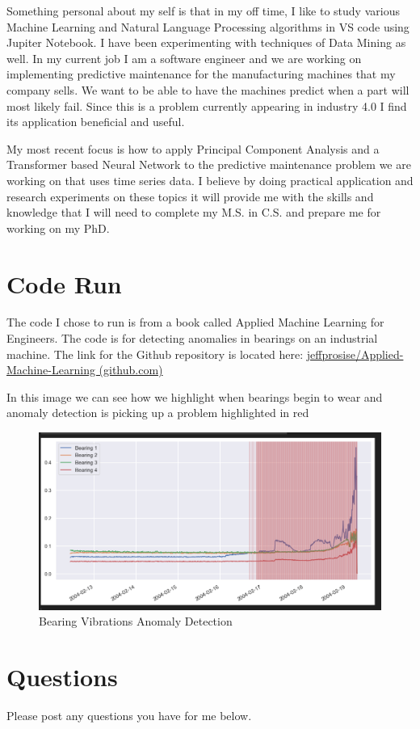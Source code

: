\documentclass{article}
\begin{document}
Something personal about my self is that in my off time, I like to study various Machine Learning and Natural Language Processing algorithms in VS code using Jupiter Notebook. I have been experimenting with techniques of Data Mining as well. In my current job I am a software engineer and we are working on implementing predictive maintenance for the manufacturing machines that my company sells. We want to be able to have the machines predict when a part will most likely fail. Since this is a problem currently appearing in industry 4.0 I find its application beneficial and useful.

My most recent focus is how to apply Principal Component Analysis and a Transformer based Neural Network to the predictive maintenance problem we are working on that uses time series data. I believe by doing practical application and research experiments on these topics it will provide me with the skills and knowledge that I will need to complete my M.S. in C.S. and prepare me for working on my PhD.

\section{Code Run}

The code I chose to run is from a book called Applied Machine Learning for Engineers. The code is for detecting anomalies in bearings on an industrial machine. The link for the Github repository is located here: \href{Applied Machine Learning for Engineers}{\href{https://github.com/jeffprosise/Applied-Machine-Learning}{jeffprosise/Applied-Machine-Learning (github.com)}}

In this image we can see how we highlight when bearings begin to wear and anomaly detection is picking up a problem highlighted in red

\begin{figure}[!h]
    \centering
    \includegraphics[width=0.5\linewidth]{images/bearing vibrations 2024-10-20.png}
    \caption{Bearing Vibrations Anomaly Detection}
    \label{fig:1}
\end{figure}


\section{Questions}

Please post any questions you have for me below.
\end{document}
